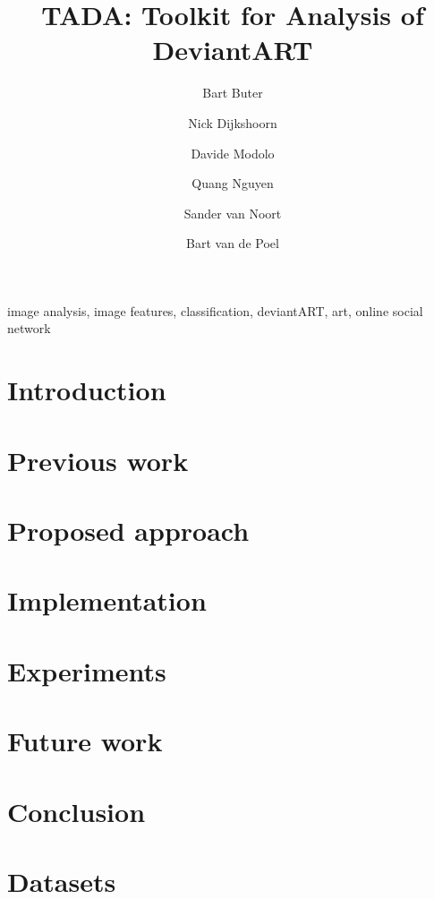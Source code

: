 \documentclass[%
        final,
        notitlepage,
        narroweqnarray,
        inline,
        ]{ieee}
\begin{document}
\title[TADA: Toolkit for Analysis of DeviantART]{TADA: Toolkit for Analysis of DeviantART}
\author{Bart Buter \and Nick Dijkshoorn \and Davide Modolo \and Quang Nguyen \and Sander van Noort \and Bart van de Poel}

\maketitle


\begin{abstract}

\end{abstract}


\begin{keywords}
image analysis, image features, classification, deviantART, art, online social network
\end{keywords}


\section{Introduction}



\section{Previous work}


\section{Proposed approach}



\section{Implementation}



\section{Experiments}



\section{Future work}


\section{Conclusion}


\appendix
\section{Datasets}


\nocite{*}



\end{document}
